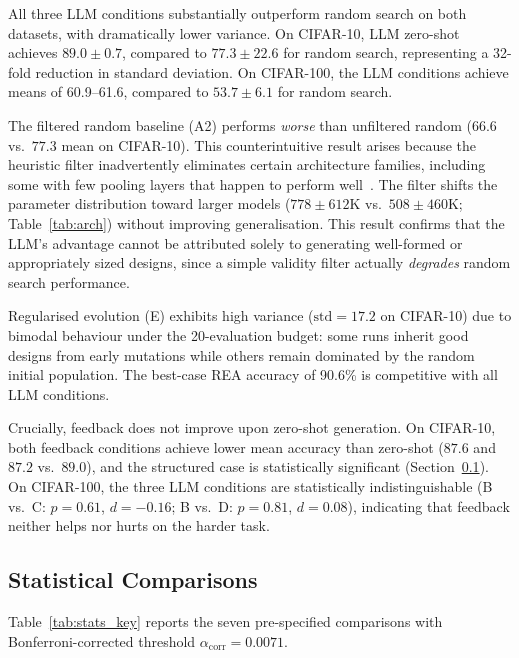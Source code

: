 \documentclass[10pt]{article}
\begin{document}
All three LLM conditions substantially outperform random search on both
datasets, with dramatically lower variance.  On CIFAR-10, LLM zero-shot achieves
$89.0\pm0.7$, compared to $77.3\pm22.6$ for random search, representing a
32-fold reduction in standard deviation.  On CIFAR-100, the LLM conditions
achieve means of 60.9--61.6, compared to $53.7\pm6.1$ for random search.

The filtered random baseline (A2) performs \emph{worse} than unfiltered random
($66.6$ vs.\ $77.3$ mean on CIFAR-10).  This counterintuitive result arises
because the heuristic filter inadvertently eliminates certain architecture
families, including some with few pooling layers that happen to perform
well~\citep{tan2019efficientnet}.  The filter shifts the parameter distribution
toward larger models ($778{\pm}612$K vs.\ $508{\pm}460$K;
Table~\ref{tab:arch}) without improving generalisation.  This result confirms
that the LLM's advantage cannot be attributed solely to generating well-formed
or appropriately sized designs, since a simple validity filter actually
\emph{degrades} random search performance.

Regularised evolution (E) exhibits high variance ($\text{std}{=}17.2$ on
CIFAR-10) due to bimodal behaviour under the 20-evaluation budget: some runs
inherit good designs from early mutations while others remain dominated by the
random initial population.  The best-case REA accuracy of 90.6\% is competitive
with all LLM conditions.

Crucially, feedback does not improve upon zero-shot generation.  On CIFAR-10,
both feedback conditions achieve lower mean accuracy than zero-shot ($87.6$ and
$87.2$ vs.\ $89.0$), and the structured case is statistically significant
(Section~\ref{sec:statcomp}).  On CIFAR-100, the three LLM conditions are
statistically indistinguishable (B vs.\ C: $p{=}0.61$, $d{=}{-}0.16$; B vs.\
D: $p{=}0.81$, $d{=}0.08$), indicating that feedback neither helps nor hurts
on the harder task.

\subsection{Statistical Comparisons}
\label{sec:statcomp}

Table~\ref{tab:stats_key} reports the seven pre-specified comparisons with
Bonferroni-corrected threshold $\alpha_{\mathrm{corr}}{=}0.0071$.
\end{document}
